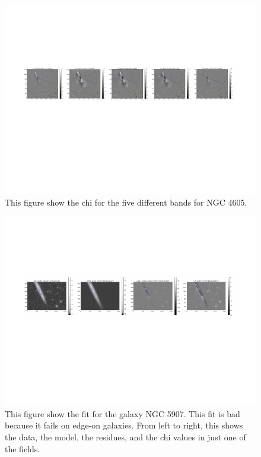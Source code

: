 \documentclass[12pt,preprint,pdftex]{aastex}
\begin{document}
\begin{figure}
\centering
\includegraphics[trim = .9cm 4.5cm 0cm 2.9cm,clip=true,width=\textwidth] {goodsingle-colors-chi.pdf}
\caption{This figure show the chi for the five different bands for NGC 4605.}
\label{fig:colorschi}
\end{figure}
\begin{figure}
\centering
\includegraphics[trim = .9cm 4.5cm 1.15cm 2.9cm,clip=true,width=\textwidth] {edgeon.pdf}
\caption{This figure show the fit for the galaxy NGC 5907. This fit is bad because it fails on edge-on galaxies. From left to right, this shows the data, the model, the residues, and the chi values in just one of the fields.}
\label{fig:edgeon}
\end{figure}
\end{document}
